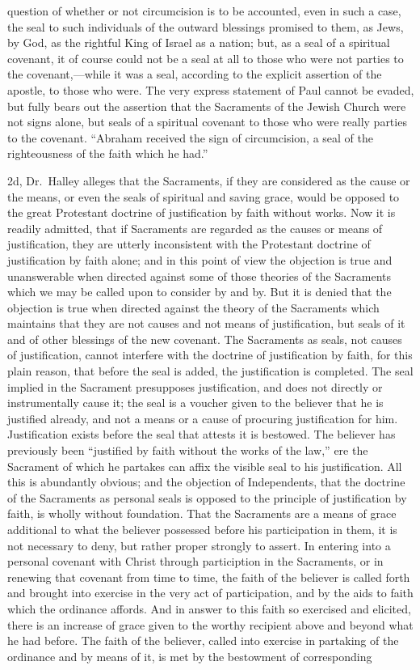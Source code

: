 \documentclass[]{book}
\begin{document}
question of whether or not circumcision is to be accounted, even in such a case, the seal to such individuals of the outward blessings promised to them, as Jews, by God, as the rightful King of Israel as a nation; but, as a seal of a spiritual covenant, it of course could not be a seal at all to those who were not parties to the covenant,---while it was a seal, according to the explicit assertion of the apostle, to those who were. The very express statement of Paul cannot be evaded, but fully bears out the assertion that the Sacraments of the Jewish Church were not signs alone, but seals of a spiritual covenant to those who were really parties to the covenant. ``Abraham received the sign of circumcision, a seal of the righteousness of the faith which he had.''

2d, Dr.~Halley alleges that the Sacraments, if they are considered as the cause or the means, or even the seals of spiritual and saving grace, would be opposed to the great Protestant doctrine of justification by faith without works. Now it is readily admitted, that if Sacraments are regarded as the causes or means of justification, they are utterly inconsistent with the Protestant doctrine of justification by faith alone; and in this point of view the objection is true and unanswerable when directed against some of those theories of the Sacraments which we may be called upon to consider by and by. But it is denied that the objection is true when directed against the theory of the Sacraments which maintains that they are not causes and not means of justification, but seals of it and of other blessings of the new covenant. The Sacraments as seals, not causes of justification, cannot interfere with the doctrine of justification by faith, for this plain reason, that before the seal is added, the justification is completed. The seal implied in the Sacrament presupposes justification, and does not directly or instrumentally cause it; the seal is a voucher given to the believer that he is justified already, and not a means or a cause of procuring justification for him. Justification exists before the seal that attests it is bestowed. The believer has previously been ``justified by faith without the works of the law,'' ere the Sacrament of which he partakes can affix the visible seal to his justification. All this is abundantly obvious; and the objection of Independents, that the doctrine of the Sacraments as personal seals is opposed to the principle of justification by faith, is wholly without foundation. That the Sacraments are a means of grace additional to what the believer possessed before his participation in them, it is not necessary to deny, but rather proper strongly to assert. In entering into a personal covenant with Christ through particiption in the Sacraments, or in renewing that covenant from time to time, the faith of the believer is called forth and brought into exercise in the very act of participation, and by the aids to faith which the ordinance affords. And in answer to this faith so exercised and elicited, there is an increase of grace given to the worthy recipient above and beyond what he had before. The faith of the believer, called into exercise in partaking of the ordinance and by means of it, is met by the bestowment of corresponding 
\end{document}
